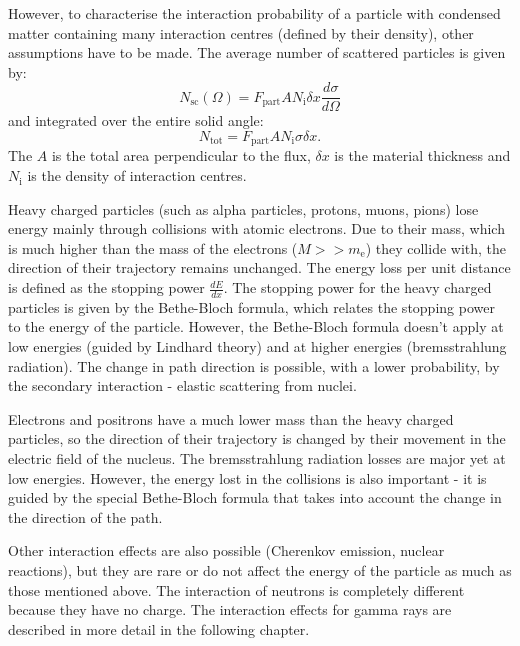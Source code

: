 However, to characterise the interaction probability of a particle with condensed matter containing many interaction centres (defined by their density), other assumptions have to be made. The average number of scattered particles is given by:
 \begin{equation}
 N_{\textrm{sc}}(\Omega) = F_{\textrm{part}}AN_{\textrm{i}} \delta x \frac{d\sigma}{d\Omega}
 \end{equation}
and integrated over the entire solid angle:
 \begin{equation}
 N_{\textrm{tot}} = F_{\textrm{part}}AN_{\textrm{i}}\sigma \delta x.
 \end{equation}
The $A$ is the total area perpendicular to the flux, $\delta x$ is the material thickness and $N_{\textrm{i}}$ is the density of interaction centres.
\par
Heavy charged particles (such as alpha particles, protons, muons, pions) lose energy mainly through collisions with atomic electrons. Due to their mass, which is much higher than the mass of the electrons ($M >> m_\textrm{e}$) they collide with, the direction of their trajectory remains unchanged. The energy loss per unit distance is defined as the stopping power $\frac{dE}{dx}$. The stopping power for the heavy charged particles is given by the Bethe-Bloch formula, which relates the stopping power to the energy of the particle. However, the Bethe-Bloch formula doesn't apply at low energies (guided by Lindhard theory) and at higher energies (bremsstrahlung radiation). The change in path direction is possible, with a lower probability, by the secondary interaction - elastic scattering from nuclei.
\par
Electrons and positrons have a much lower mass than the heavy charged particles, so the direction of their trajectory is changed by their movement in the electric field of the nucleus. The bremsstrahlung radiation losses are major yet at low energies. However, the energy lost in the collisions is also important - it is guided by the special Bethe-Bloch formula that takes into account the change in the direction of the path. 
\par
Other interaction effects are also possible (Cherenkov emission, nuclear reactions), but they are rare or do not affect the energy of the particle as much as those mentioned above. The interaction of neutrons is completely different because they have no charge. The interaction effects for gamma rays are described in more detail in the following chapter.  
